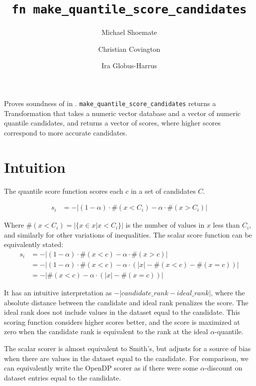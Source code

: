 \documentclass{article}
\title{\texttt{fn make\_quantile\_score\_candidates}}
\author{Michael Shoemate \and Christian Covington \and Ira Globus-Harrus}
\begin{document}
\maketitle  


\contrib

Proves soundness of  
in .
\texttt{make\_quantile\_score\_candidates} returns a Transformation that 
takes a numeric vector database and a vector of numeric quantile candidates,
and returns a vector of scores, where higher scores correspond to more accurate candidates.

\section{Intuition}
The quantile score function scores each $c$ in a set of candidates $C$.

\begin{equation}
\begin{array}{rl}
    s_i &= -|(1 - \alpha) \cdot \#(x < C_i) - \alpha \cdot \#(x > C_i)|
\end{array}
\end{equation}

Where $\#(x < C_i) = |\{x \in x | x < C_i\}|$ is the number of values in $x$ less than $C_i$, 
and similarly for other variations of inequalities.
The scalar score function can be equivalently stated:
\begin{align}
    s_i &= -|(1 - \alpha) \cdot \#(x < c) - \alpha \cdot \#(x > c)| \\
    &= -|(1 - \alpha) \cdot \#(x < c) - \alpha \cdot (|x| - \#(x < c) - \#(x = c))| \\
    &= -|\#(x < c) - \alpha \cdot (|x| - \#(x = c))|
\end{align}

It has an intuitive interpretation as $-|candidate\_rank - ideal\_rank|$, 
where the absolute distance between the candidate and ideal rank penalizes the score.
The ideal rank does not include values in the dataset equal to the candidate.
This scoring function considers higher scores better, 
and the score is maximized at zero when the candidate rank is equivalent to the rank at the ideal $\alpha$-quantile.

The scalar scorer is almost equivalent to Smith's\cite{Smith11}, but adjusts for a source of bias when there are values in the dataset equal to the candidate.
For comparison, we can equivalently write the OpenDP scorer as if there were some $\alpha$-discount on dataset entries equal to the candidate.
\end{document}
